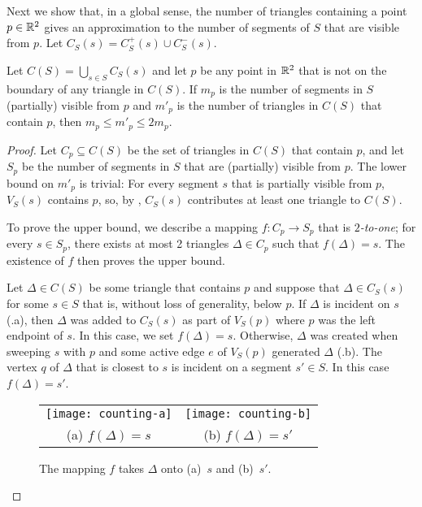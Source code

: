 \documentclass{patmorin}
\begin{document}
Next we show that, in a global sense, the number of triangles containing a
point $p\in\mathbb{R}^2$ gives an approximation to the number of segments of $S$
that are visible from $p$. Let $C_S(s) = C^+_S(s)\cup C^-_S(s)$.

\begin{lem}
Let $C(S)=\bigcup_{s\in S} C_S(s)$ and let $p$ be any point in $\mathbb{R}^2$ that
is not on the boundary of any triangle in $C(S)$.  If $m_p$ is the number
of segments in $S$ (partially) visible from $p$ and $m'_p$ is the number
of triangles in $C(S)$ that contain $p$, then $m_p \le m'_p \le 2m_p$.
\end{lem}

\begin{proof}
Let $C_p\subseteq C(S)$ be the set of triangles in $C(S)$ that contain
$p$, and let $S_p$ be the number of segments in $S$ that are (partially)
visible from $p$.  The lower bound on $m'_p$ is trivial:  For every
segment $s$ that is partially visible from $p$, $V_S(s)$ contains $p$,
so, by , $C_S(s)$ contributes at least one triangle to $C(S)$.

To prove the upper bound, we describe a mapping $f: C_p \rightarrow S_p$
that is \emph{$2$-to-one}; for every $s\in S_p$, there exists at most 2
triangles $\Delta\in C_p$ such that $f(\Delta)=s$. The existence of $f$
then proves the upper bound.

Let $\Delta\in C(S)$ be some triangle that contains $p$ and suppose that
$\Delta\in C_S(s)$ for some $s\in S$ that is, without loss of generality,
below $p$.  If $\Delta$ is incident on $s$ (.a), then $\Delta$ was added to
$C_S(s)$ as part of $V_S(p)$ where $p$ was the left endpoint of $s$.  In
this case, we set $f(\Delta)=s$.  Otherwise, $\Delta$ was created when
sweeping $s$ with $p$ and some active edge $e$ of $V_S(p)$ generated
$\Delta$ (.b).  The vertex $q$ of $\Delta$ that is closest to $s$ is incident on a
segment $s'\in S$.  In this case $f(\Delta)=s'$.

\begin{figure}
  \begin{center}
    \begin{tabular}{cc}
      \texttt{[image: counting-a]} &
      \texttt{[image: counting-b]} \\
      (a) $f(\Delta)=s$ & (b) $f(\Delta)=s'$
    \end{tabular}
  \end{center}
  \caption{The mapping $f$ takes $\Delta$ onto (a)~$s$ and (b)~$s'$.}
\end{figure}


\end{proof}
\end{document}
